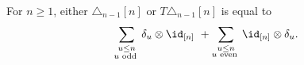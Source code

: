 \begin{lemma}
	For $n \geq 1$, either $\triangle_{n-1} [n]$ or $T \triangle_{n-1} [n]$ is equal to
	\[
	\sum_{\substack{u \leq n \\ u \text{ odd }}} \delta_u \otimes \id_{[n]} \ + \sum_{\substack{u \leq n \\ u \text{ even }}} \id_{[n]} \otimes \delta_u.
	\]
\end{lemma}

